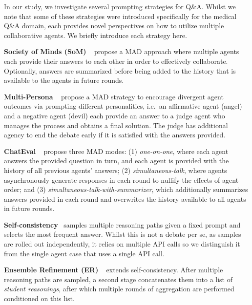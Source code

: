 \documentclass{article}  %
\begin{document}
In our study, we investigate several prompting strategies for Q\&A. Whilst we note that some of these strategies were introduced specifically for the medical Q\&A domain, each provides novel perspectives on how to utilize multiple collaborative agents. 
We briefly introduce each strategy here. 

\textbf{Society of Minds (SoM)} ~\citet{du2023improving} propose a MAD approach where multiple agents each provide their answers to each other in order to effectively collaborate. Optionally, answers are summarized before being added to the history that is available to the agents in future rounds.

\textbf{Multi-Persona} ~\cite{liang2023encouraging} propose a MAD strategy to encourage divergent agent outcomes via prompting different personalities, i.e.\ an affirmative agent (angel) and a negative agent (devil) each provide an answer to a judge agent who manages the process and obtains a final solution. The judge has additional agency to end the debate early if it is satisfied with the answers provided. 

\textbf{ChatEval} ~\cite{chan2023chateval} propose three MAD modes: 
(1) \emph{one-on-one}, where each agent answers the provided question in turn, and each agent is provided with the history of all previous agents' answers; 
(2) \emph{simultaneous-talk}, where agents asynchronously generate responses in each round to nullify the effects of agent order; and
(3) \emph{simultaneous-talk-with-summarizer}, which additionally summarizes answers provided in each round and overwrites the history available to all agents in future rounds. 

\textbf{Self-consistency}~\cite{wang2022self} samples multiple reasoning paths given a fixed prompt and selects the most frequent answer. 
Whilst this is not a debate per se, as samples are rolled out independently, it relies on multiple API calls so we distinguish it from the single agent case that uses a single API call.

\textbf{Ensemble Refinement (ER)} ~\cite{singhal2023medpalm} extends self-consistency. After multiple reasoning paths are sampled, a second stage concatenates them into a list of \textit{student reasonings}, after which multiple rounds of aggregation are performed conditioned on this list. 
\end{document}
